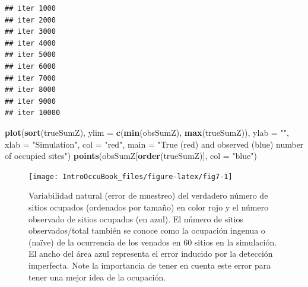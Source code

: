 \documentclass[
]{book}
\newenvironment{Shaded}{\begin{snugshade}}{\end{snugshade}}
\newcommand{\CharTok}[1]{\textcolor[rgb]{0.31,0.60,0.02}{#1}}
\newcommand{\CommentTok}[1]{\textcolor[rgb]{0.56,0.35,0.01}{\textit{#1}}}
\newcommand{\ControlFlowTok}[1]{\textcolor[rgb]{0.13,0.29,0.53}{\textbf{#1}}}
\newcommand{\DataTypeTok}[1]{\textcolor[rgb]{0.13,0.29,0.53}{#1}}
\newcommand{\DecValTok}[1]{\textcolor[rgb]{0.00,0.00,0.81}{#1}}
\newcommand{\KeywordTok}[1]{\textcolor[rgb]{0.13,0.29,0.53}{\textbf{#1}}}
\newcommand{\NormalTok}[1]{#1}
\newcommand{\OperatorTok}[1]{\textcolor[rgb]{0.81,0.36,0.00}{\textbf{#1}}}
\newcommand{\OtherTok}[1]{\textcolor[rgb]{0.56,0.35,0.01}{#1}}
\newcommand{\StringTok}[1]{\textcolor[rgb]{0.31,0.60,0.02}{#1}}
\begin{document}
\begin{Shaded}
\end{Shaded}

\begin{verbatim}
## iter 1000
## iter 2000
## iter 3000
## iter 4000
## iter 5000
## iter 6000
## iter 7000
## iter 8000
## iter 9000
## iter 10000
\end{verbatim}

\begin{Shaded}
\begin{Highlighting}[]
\KeywordTok{plot}\NormalTok{(}\KeywordTok{sort}\NormalTok{(trueSumZ), }\DataTypeTok{ylim =} \KeywordTok{c}\NormalTok{(}\KeywordTok{min}\NormalTok{(obsSumZ), }\KeywordTok{max}\NormalTok{(trueSumZ)), }\DataTypeTok{ylab =} \StringTok{""}\NormalTok{, }\DataTypeTok{xlab =} \StringTok{"Simulation"}\NormalTok{,}
     \DataTypeTok{col =} \StringTok{"red"}\NormalTok{, }\DataTypeTok{main =} \StringTok{"True (red) and observed (blue) number of occupied sites"}\NormalTok{)}
\KeywordTok{points}\NormalTok{(obsSumZ[}\KeywordTok{order}\NormalTok{(trueSumZ)], }\DataTypeTok{col =} \StringTok{"blue"}\NormalTok{)}
\end{Highlighting}
\end{Shaded}

\begin{figure}
\texttt{[image: IntroOccuBook\_files/figure-latex/fig7-1]} \caption[fig7]{Variabilidad natural (error de muestreo) del verdadero número de sitios ocupados (ordenados por tamaño) en color rojo y el número observado de sitios ocupados (en azul). El número de sitios observados/total también se conoce como la ocupación ingenua o (naïve) de la ocurrencia de los venados en 60 sitios en la simulación. El ancho del área azul representa el error inducido por la detección imperfecta. Note la importancia de tener en cuenta este error para tener una mejor idea de la ocupación.}\label{fig:fig7}
\end{figure}
\end{document}
